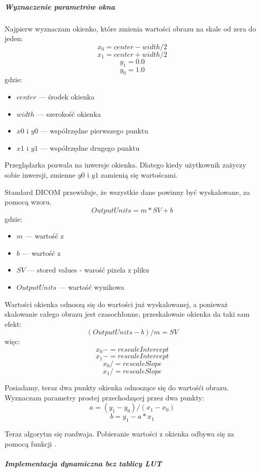 \subparagraph{Wyznaczenie parametrów okna}
\par
Najpierw wyznaczam okienko, które zmienia wartości obrazu na skale od zera do jeden:
\[x_0 = center - width / 2\]
\[x_1 = center + width / 2\]
\[y_1 = 0.0\]
\[y_0 = 1.0\]
gdzie:
\begin{itemize}
    \item $center$ --- środek okienka
    \item $width$ --- szerokość okienka
    \item $x0$ i $y0$ --- współrzędne pierwszego punktu
    \item $x1$ i $y1$ --- współrzędne drugego punktu
\end{itemize}
Przeglądarka pozwala na inwersje okienka.
Dlatego kiedy użytkownik zażyczy sobie inwersji, zmienne $y0$ i $y1$ zamienią się wartoścami.

Standard DICOM przewiduje, że wszystkie dane powinny być wyskalowane, za pomocą wzoru.
\[OutputUnits = m*SV + b\]
gdzie:
\begin{itemize}
    \item $m$ --- wartość z 
    \item $b$ --- wartość z 
    \item $SV$ --- stored values - warość pixela z pliku
    \item $OutputUnits$ --- wartość wynikowa
\end{itemize}

Wartości okienka odnoszą się do wartości już wyskalowanej, a ponieważ skalowanie całego obrazu jest czasochłonne, przeskalowaie okienka da taki sam efekt:
\[(OutputUnits - b ) / m = SV \]
więc:
\[x_0 -= rescaleIntercept\]
\[x_1 -= rescaleIntercept\]
\[x_0 /= rescaleSlope\]
\[x_1 /= rescaleSlope\]

Posiadamy, teraz dwa punkty okienka odnoszące się do wartośći obrazu.
Wyznaczam parametry prostej przechodzącej przez dwa punkty:
\[a = (y_1 - y_0) / (x_1 - x_0)\]
\[b = y_1 - a * x_1\]

\par
Teraz algorytm się rozdwaja.
Pobieranie wartości z okienka odbywa się za pomocą funkcji .

\subparagraph{Implementacja dynamiczna bez tablicy LUT}

